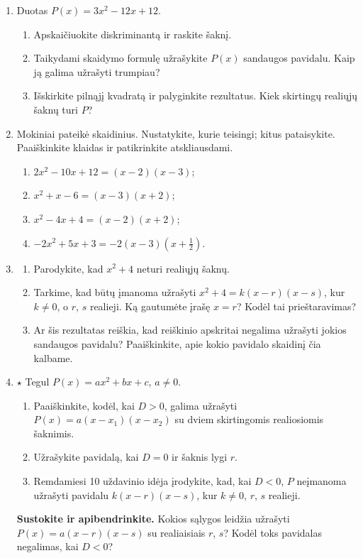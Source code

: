 \documentclass[12pt,a4paper]{article}
\begin{document}
\begin{enumerate}[series=uzdaviniai]
\begin{enumerate}
\end{enumerate}
\item Duotas $P(x)=3x^2-12x+12$.
\begin{enumerate}
\item Apskaičiuokite diskriminantą ir raskite šaknį.
\item Taikydami skaidymo formulę užrašykite $P(x)$ sandaugos pavidalu. Kaip ją galima užrašyti trumpiau?
\item Išskirkite pilnąjį kvadratą ir palyginkite rezultatus. Kiek skirtingų realiųjų šaknų turi $P$?
\end{enumerate}
\item Mokiniai pateikė skaidinius. Nustatykite, kurie teisingi; kitus pataisykite. Paaiškinkite klaidas ir patikrinkite atskliausdami.
\begin{enumerate}
\item $2x^2-10x+12=(x-2)(x-3)$; \item $x^2+x-6=(x-3)(x+2)$;
\item $x^2-4x+4=(x-2)(x+2)$; \item $-2x^2+5x+3=-2(x-3)\left(x+\frac{1}{2}\right)$.
\end{enumerate}
\item \begin{enumerate}
\item Parodykite, kad $x^2+4$ neturi realiųjų šaknų.
\item Tarkime, kad būtų įmanoma užrašyti $x^2+4=k(x-r)(x-s)$, kur $k\ne0$, o $r$, $s$ realieji. Ką gautumėte įrašę $x=r$? Kodėl tai prieštaravimas?
\item Ar šis rezultatas reiškia, kad reiškinio apskritai negalima užrašyti jokios sandaugos pavidalu? Paaiškinkite, apie kokio pavidalo skaidinį čia kalbame.
\end{enumerate}
\item $\star$ Tegul $P(x)=ax^2+bx+c$, $a\ne0$.
\begin{enumerate}
\item Paaiškinkite, kodėl, kai $D>0$, galima užrašyti $P(x)=a(x-x_1)(x-x_2)$ su dviem skirtingomis realiosiomis šaknimis.
\item Užrašykite pavidalą, kai $D=0$ ir šaknis lygi $r$.
\item Remdamiesi 10 uždavinio idėja įrodykite, kad, kai $D<0$, $P$ neįmanoma užrašyti pavidalu $k(x-r)(x-s)$, kur $k\ne0$, $r$, $s$ realieji.
\end{enumerate}
\par\medskip
\textbf{Sustokite ir apibendrinkite.} Kokios sąlygos leidžia užrašyti $P(x)=a(x-r)(x-s)$ su realiaisiais $r$, $s$? Kodėl toks pavidalas negalimas, kai $D<0$?

\end{enumerate}
\end{document}
